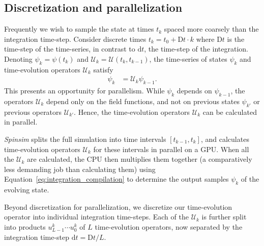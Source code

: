 \documentclass{jors}
\begin{document}
	\subsection{Discretization and parallelization}\label{sec:parallelization}
		Frequently we wish to sample the state at times $ t_k $ spaced more coarsely than the integration time-step.
		Consider discrete times $ t_k = t_0 + \mathrm{D}t\cdot k $ where $ \mathrm{D}t $ is the time-step of the time-series, in contrast to $ \mathrm{d}t $, the time-step of the integration.
		Denoting $ \psi_k = \psi(t_k) $ and $ \mathcal{U}_k = \mathcal{U}(t_{k}, t_{k-1}) $, the time-series of states $  \psi_k $ and time-evolution operators $ \mathcal{U}_k $ satisfy
		\begin{align}
			\psi_k &= \mathcal{U}_k\psi_{k-1}.\label{eq:integration_compilation}
		\end{align}
		This presents an opportunity for parallelism.
		While $ \psi_k $ depends on $ \psi_{k-1} $, the operators $ \mathcal{U}_k $ depend only on the field functions, and not on previous states $ \psi_{k'} $ or previous operators $ \mathcal{U}_{k'} $.
		Hence, the time-evolution operators $ \mathcal{U}_k $ can be calculated in parallel.

		\emph{Spinsim} splits the full simulation into time intervals $ [t_{k - 1}, t_{k}] $, and calculates time-evolution operators $ \mathcal{U}_k $ for these intervals in parallel on a GPU. %
		When all the $ \mathcal{U}_k $ are calculated, the CPU then multiplies them together (a comparatively less demanding job than calculating them) using Equation~\eqref{eq:integration_compilation} to determine the output samples $ \psi_k $ of the evolving state.

		Beyond discretization for parallelization, we discretize our time-evolution operator into individual integration time-steps.
		Each of the $ \mathcal{U}_k $ is further split into products $ u^k_{L-1} \cdots u^k_0 $ of $ L $ time-evolution operators, now separated by the integration time-step $ \mathrm{d}t = \mathrm{D}t/L $.
		
\end{document}
